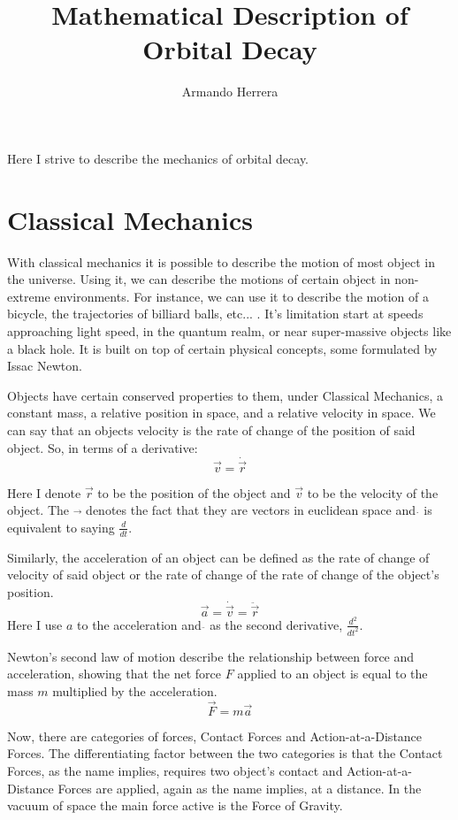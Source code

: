 \documentclass{article}
\title{Mathematical Description of Orbital Decay}
\author{Armando Herrera}
\begin{document}
\maketitle

Here I strive to describe the mechanics of orbital decay.

\section{Classical Mechanics}

With classical mechanics it is possible to describe the motion of most object in the universe. Using it, we can describe the motions of certain object in non-extreme environments. For instance, we can use it to describe the motion of a bicycle, the trajectories of billiard balls, etc... . It's limitation start at speeds approaching light speed, in the quantum realm, or near super-massive objects like a black hole. It is built on top of certain physical concepts, some formulated by Issac Newton.

Objects have certain conserved properties to them, under Classical Mechanics, a constant mass, a relative position in space, and a relative velocity in space. We can say that an objects velocity is the rate of change of the position of said object. So, in terms of a derivative: $$\vec{v}=\dot{\vec{r}}$$ 

Here I denote $\vec{r}$ to be the position of the object and $\vec{v}$ to be the velocity of the object. The $\vec{}$ denotes the fact that they are vectors in euclidean space and $\dot{}$ is equivalent to saying $\frac{d}{dt}$.

Similarly, the acceleration of an object can be defined as the rate of change of velocity of said object or the rate of change of the rate of change of the object's position. $$\vec{a}=\dot{\vec{v}}=\ddot{\vec{r}}$$ 
Here I use $a$ to the acceleration and $\ddot{}$ as the second derivative, $\frac{d^2}{dt^2}$.

Newton's second law of motion describe the relationship between force and acceleration, showing that the net force $F$ applied to an object is equal to the mass $m$ multiplied by the acceleration. 
\begin{equation}\label{eq:newton}
\vec{F}=m\vec{a}
\end{equation}

Now, there are categories of forces, Contact Forces and Action-at-a-Distance Forces. The differentiating factor between the two categories is that the Contact Forces, as the name implies, requires two object's contact and Action-at-a-Distance Forces are applied, again as the name implies, at a distance. In the vacuum of space the main force active is the Force of Gravity.
\end{document}
